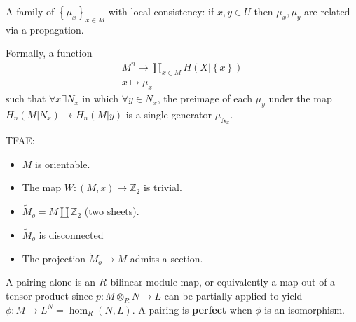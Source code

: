 \begin{definition}

A family of \(\left\{{\mu_{x}}\right\}_{x\in M}\) with local
consistency: if \(x,y \in U\) then \(\mu_{x}, \mu_{y}\) are related via
a propagation.

Formally, a function
\begin{align*}M^n \to \coprod_{x\in M} H(X \mathrel{\Big|}\left\{{x}\right\})\\ x \mapsto \mu_{x}\end{align*}
such that \(\forall x \exists N_{x}\) in which \(\forall y\in N_{x}\),
the preimage of each \(\mu_{y}\) under the map
\(H_{n}(M\mathrel{\Big|}N_{x}) \twoheadrightarrow H_{n}(M\mathrel{\Big|}y)\)
is a single generator \(\mu_{N_{x}}\).

TFAE:

\begin{itemize}
\tightlist
\item
  \(M\) is orientable.
\item
  The map \(W: (M, x) \to {\mathbb{Z}}_{2}\) is trivial.
\item
  \(\tilde M_{o} = M \coprod {\mathbb{Z}}_{2}\) (two sheets).
\item
  \(\tilde M_{o}\) is disconnected
\item
  The projection \(\tilde M_{o} \to M\) admits a section.
\end{itemize}

\end{definition}

\begin{definition}

\end{definition}


\begin{definition}[Path]

\end{definition}


\begin{definition}

\end{definition}


\begin{definition}

A pairing alone is an \(R{\hbox{-}}\)bilinear module map, or
equivalently a map out of a tensor product since
\(p: M\otimes_{R} N \to L\) can be partially applied to yield
\(\phi: M \to L^N = \hom_{R}(N, L)\). A pairing is \textbf{perfect} when
\(\phi\) is an isomorphism.

\end{definition}

